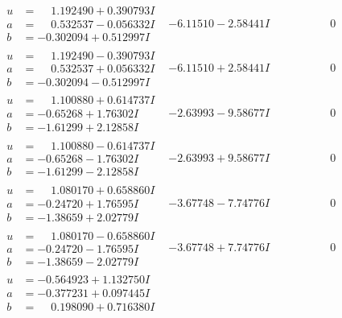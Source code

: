 \documentclass[1p]{elsarticle_modified}
\theoremstyle{definition}
\begin{document}
$$\begin{array}{c|c|c}
 \hline 
\begin{aligned}
u &= \phantom{-}1.192490 + 0.390793 I \\
a &= \phantom{-}0.532537 - 0.056332 I \\
b &= -0.302094 + 0.512997 I\end{aligned}
 & -6.11510 - 2.58441 I & \phantom{-0.000000 } 0 \\ \hline\begin{aligned}
u &= \phantom{-}1.192490 - 0.390793 I \\
a &= \phantom{-}0.532537 + 0.056332 I \\
b &= -0.302094 - 0.512997 I\end{aligned}
 & -6.11510 + 2.58441 I & \phantom{-0.000000 } 0 \\ \hline\begin{aligned}
u &= \phantom{-}1.100880 + 0.614737 I \\
a &= -0.65268 + 1.76302 I \\
b &= -1.61299 + 2.12858 I\end{aligned}
 & -2.63993 - 9.58677 I & \phantom{-0.000000 } 0 \\ \hline\begin{aligned}
u &= \phantom{-}1.100880 - 0.614737 I \\
a &= -0.65268 - 1.76302 I \\
b &= -1.61299 - 2.12858 I\end{aligned}
 & -2.63993 + 9.58677 I & \phantom{-0.000000 } 0 \\ \hline\begin{aligned}
u &= \phantom{-}1.080170 + 0.658860 I \\
a &= -0.24720 + 1.76595 I \\
b &= -1.38659 + 2.02779 I\end{aligned}
 & -3.67748 - 7.74776 I & \phantom{-0.000000 } 0 \\ \hline\begin{aligned}
u &= \phantom{-}1.080170 - 0.658860 I \\
a &= -0.24720 - 1.76595 I \\
b &= -1.38659 - 2.02779 I\end{aligned}
 & -3.67748 + 7.74776 I & \phantom{-0.000000 } 0 \\ \hline\begin{aligned}
u &= -0.564923 + 1.132750 I \\
a &= -0.377231 + 0.097445 I \\
b &= \phantom{-}0.198090 + 0.716380 I\end{aligned}

\end{array}$$
\end{document}
